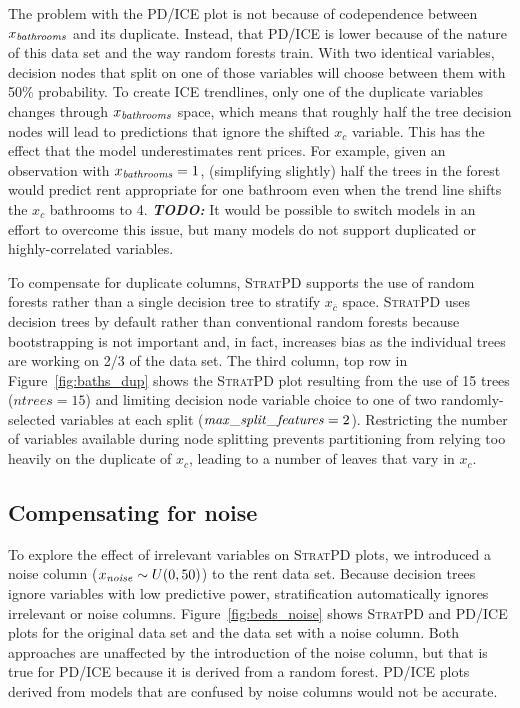 \documentclass[12pt]{article}
\newcommand{\figref}[1]{Figure~\ref{#1}}
\newcommand{\todo}[1]{{\bf\em TODO:} {{\color{red}{#1}}}}
\newcommand{\spd}{\fontfamily{cmr}\textsc{\small StratPD}}
\newcommand{\xnc}{$x_{\overline{c}}$}
\begin{document}
The problem with the PD/ICE plot is not because of codependence between $x_{\it bathrooms}$ and its duplicate. Instead, that PD/ICE is lower because of the nature of this data set and the way random forests train. With two identical variables, decision nodes that split on one of those variables will choose between them with 50\% probability.  To create ICE trendlines, only one of the duplicate variables changes through $x_{\it bathrooms}$ space, which means that roughly half the tree decision nodes will lead to predictions that ignore the shifted $x_c$ variable.  This has the effect that the model underestimates rent prices.  For example, given an observation with $x_{\it bathrooms}=1$, (simplifying slightly) half the trees in the forest would predict rent appropriate for one bathroom even when the trend line shifts the $x_c$ bathrooms to 4. \todo{James: is this clear enough?}  It would be possible to switch models in an effort to overcome this issue, but many models do not support duplicated or highly-correlated variables.

To compensate for duplicate columns, \spd{} supports the use of random forests rather than a single decision tree to stratify \xnc{} space. \spd{} uses decision trees by default rather than conventional random forests because bootstrapping is not important and, in fact, increases bias as the individual trees are working on 2/3 of the data set. The third column, top row in \figref{fig:baths_dup} shows the \spd{} plot resulting from the use of 15 trees ($ntrees=15$) and limiting decision node variable choice to one of two randomly-selected variables at each split (${\it max\_split\_features}=2$).  Restricting the number of variables available during node splitting prevents partitioning from relying too heavily on the duplicate of $x_c$, leading to a number of leaves that vary in $x_c$.

\subsection{Compensating for noise}\label{sec:noise}

To explore the effect of irrelevant variables on \spd{} plots, we introduced a noise column ($x_{\it noise} \sim U(0,50)$) to the rent data set. Because decision trees ignore variables with low predictive power, stratification automatically ignores irrelevant or noise columns.  \figref{fig:beds_noise} shows \spd{} and PD/ICE plots for the original data set and the data set with a noise column. Both approaches are unaffected by the introduction of the noise column, but that is true for PD/ICE because it is derived from a random forest. PD/ICE plots derived from models that are confused by noise columns would not be accurate.
\end{document}
